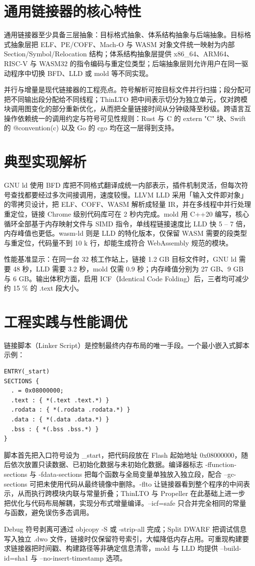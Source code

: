 \chapter{通用链接器的核心特性}
通用链接器至少具备三层抽象：目标格式抽象、体系结构抽象与后端抽象。目标格式抽象层把 ELF、PE/COFF、Mach-O 与 WASM 对象文件统一映射为内部 Section/Symbol/Relocation 结构；体系结构抽象层提供 x86\_{}64、ARM64、RISC-V 与 WASM32 的指令编码与重定位类型；后端抽象层则允许用户在同一驱动程序中切换 BFD、LLD 或 mold 等不同实现。\par
并行与增量是现代链接器的工程亮点。符号解析可按目标文件并行扫描；段分配可把不同输出段分配给不同线程；ThinLTO 把中间表示切分为独立单元，仅对跨模块调用图变化的部分重新优化，从而把全量链接时间从分钟级降至秒级。跨语言互操作依赖统一的调用约定与符号可见性规则：Rust 与 C 的 extern "C" 块、Swift 的 @convention(c) 以及 Go 的 cgo 均在这一层得到支持。\par
\chapter{典型实现解析}
GNU ld 使用 BFD 库把不同格式翻译成统一内部表示，插件机制灵活，但每次符号查找都要经过多次间接调用，速度较慢。LLVM LLD 采用「输入文件即对象」的零拷贝设计，把 ELF、COFF、WASM 解析成轻量 IR，并在多线程中并行处理重定位，链接 Chrome 级别代码库可在 2 秒内完成。mold 用 C++20 编写，核心循环全部基于内存映射文件与 SIMD 指令，单线程链接速度比 LLD 快 5 – 7 倍，内存峰值也更低。wasm-ld 则是 LLD 的特化版本，仅保留 WASM 需要的段类型与重定位，代码量不到 10 k 行，却能生成符合 WebAssembly 规范的模块。\par
性能基准显示：在同一台 32 核工作站上，链接 1.2 GB 目标文件时，GNU ld 需要 48 秒，LLD 需要 3.2 秒，mold 仅需 0.9 秒；内存峰值分别为 27 GB、9 GB 与 6 GB。输出体积方面，启用 ICF（Identical Code Folding）后，三者均可减少约 15 \%{} 的 .text 段大小。\par
\chapter{工程实践与性能调优}
链接脚本（Linker Script）是控制最终内存布局的唯一手段。一个最小嵌入式脚本示例：\par
\begin{lstlisting}
ENTRY(_start)
SECTIONS {
  . = 0x08000000;
  .text : { *(.text .text.*) }
  .rodata : { *(.rodata .rodata.*) }
  .data : { *(.data .data.*) }
  .bss : { *(.bss .bss.*) }
}
\end{lstlisting}
脚本首先把入口符号设为 \_{}start，把代码段放在 Flash 起始地址 0x08000000，随后依次放置只读数据、已初始化数据与未初始化数据。编译器标志 -ffunction-sections 与 -fdata-sections 把每个函数与全局变量单独放入独立段，配合 --gc-sections 可把未使用代码从最终镜像中删除。-flto 让链接器看到整个程序的中间表示，从而执行跨模块内联与常量折叠；ThinLTO 与 Propeller 在此基础上进一步把优化与代码布局解耦，实现分布式增量编译。--icf=safe 只合并完全相同的常量与函数，避免误伤多态调用。\par
Debug 符号剥离可通过 objcopy -S 或 -strip-all 完成；Split DWARF 把调试信息写入独立 .dwo 文件，链接时仅保留符号索引，大幅降低内存占用。可重现构建要求链接器把时间戳、构建路径等非确定信息清零，mold 与 LLD 均提供 --build-id=sha1 与 --no-insert-timestamp 选项。\par
